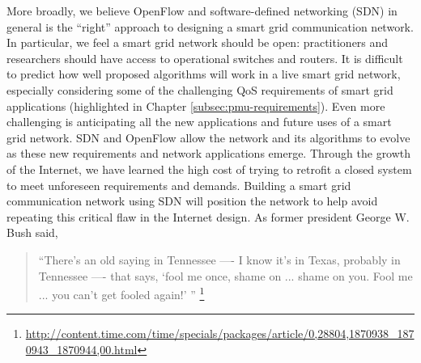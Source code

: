 More broadly, we believe OpenFlow and software-defined networking (SDN) in general is the ``right'' approach to designing a smart grid communication network.  In particular, we feel a smart grid
network should be open: practitioners and researchers should have access to operational switches and routers.  It is difficult to predict how well proposed algorithms will work in a live smart
grid network, especially considering some of the challenging QoS requirements of smart grid applications (highlighted in Chapter \ref{subsec:pmu-requirements}).  Even more challenging is anticipating
all the new applications and future uses of a smart grid network. SDN and OpenFlow allow the network and its algorithms to evolve as these new requirements and network applications emerge.  Through the 
growth of the Internet, we have learned the high cost of trying to retrofit a closed system to meet unforeseen requirements and demands.  Building a smart grid communication network using SDN
will position the network to help avoid repeating this critical flaw in the Internet design. As former president George W. Bush said, 
\begin{quote}
``There's an old saying in Tennessee —- I know it's in Texas, probably in Tennessee —- that says, `fool me once, shame on ... shame on you. Fool me ... you can't get fooled again!' ''
 \footnote{\url{http://content.time.com/time/specials/packages/article/0,28804,1870938_1870943_1870944,00.html}}
\end{quote}
